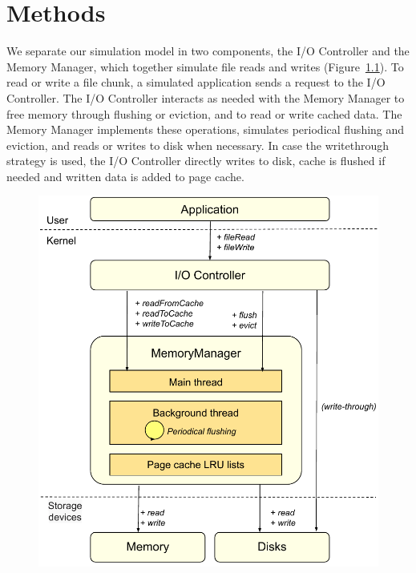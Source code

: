 \chapter{Methods}
\label{method}

We separate our simulation model in two components, the I/O
Controller and the Memory Manager, which together simulate
file reads and writes (Figure~\ref{fig:interaction}).
To read or write a file chunk, a simulated application sends a
request to the I/O Controller. The I/O Controller interacts as needed with
the Memory Manager to free memory through flushing or eviction,
and to read or write cached data. The Memory Manager
implements these operations, simulates periodical flushing
and eviction, and reads or writes to disk when necessary.
In case the writethrough strategy is used, the I/O Controller directly writes to disk, 
cache is flushed if needed and written data is added to page cache.

\begin{figure}
       \centering
       \includegraphics[width=0.7\columnwidth]{figures/interaction.pdf}
       \label{fig:interaction}
\end{figure}





